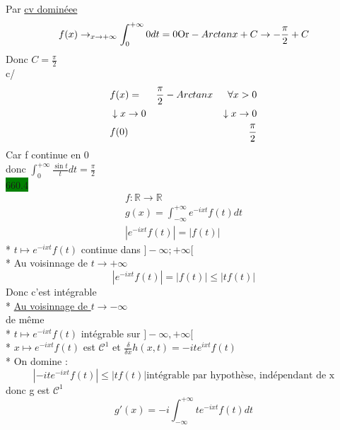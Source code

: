 \documentclass{article}
\begin{document}
Par \underline{cv dominéee}
\begin{equation*}
  f(x) \rightarrow_{x\to +\infty} \int_{0}^{+\infty}0 dt = 0\\ 
  \text{Or} - Arctanx + C \to -\frac{\pi}{2} + C
\end{equation*}
Donc \(C = \frac{\pi}{2}\)\\
c/ 
\begin{align*}
  &f(x)= &\frac{\pi}{2}-Arctan x \indent \forall x > 0\\ 
  &\downarrow x\to 0 &\downarrow x \to 0\\
  &f(0)  &\frac{\pi}{2}
\end{align*}
Car f continue en 0 \\ 
donc \(\int_{0}^{+\infty}\frac{\sin t}{t}dt = \frac{\pi}{2}\)\\

\noindent \colorbox{green}{660.4}\\
\begin{align*}
    f : \mathbb{R} \rightarrow \mathbb{R}\\
    g(x) = \int_{-\infty}^{+\infty}e^{-ixt}f(t)dt \\
    |e^{-ixt}f(t)| = |f(t)|
\end{align*}
* \(t \mapsto e^{-ixt}f(t)\) continue dans \(]-\infty; +\infty[\)\\
* Au voisinnage de \(t \rightarrow +\infty\)
\begin{equation*}
    |e^{-ixt}f(t)| = |f(t)| \leq |tf(t)|
\end{equation*}
Donc c'est intégrable\\
* \underline{Au voisinnage de \(t \rightarrow -\infty\)}\\
de même \\
* \(t \mapsto e^{-i xt}f(t)\) intégrable sur \(]-\infty, +\infty[\)\\
* \(x \mapsto e^{-i xt}f(t)\) est \(\mathcal{C}^{1}\)
et \(\frac{\delta}{\delta x}h(x,t) = -ite^{i xt}f(t)\)\\
* On domine : 
\begin{equation*}
  |-ite^{-i xt}f(t)| \leq |t f(t)| \text{intégrable par hypothèse, indépendant de x}
\end{equation*}
donc g est \(\mathcal{C}^{1}\)
\begin{equation*}
    g'(x) = -i \int_{-\infty}^{+\infty} t e^{-i xt}f(t)dt
\end{equation*}
\end{document}
